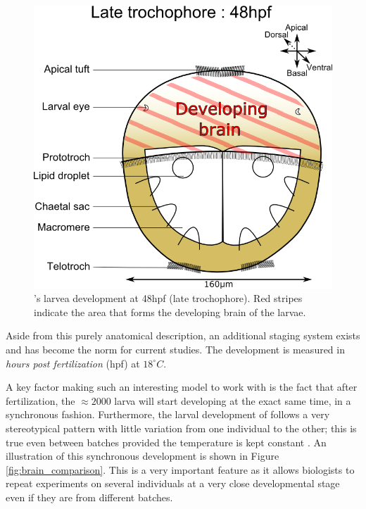 \begin{figure}[bth]
\begin{center}
  \includegraphics[width=0.6\linewidth]{gfx/chapter1/larvae48hpf.png}
\end{center}
  \caption{\platyfull{}'s larvea development at 48hpf (late trochophore). Red stripes indicate the area that forms the developing brain of the larvae.}
  \label{fig:platynereis_larvae_scheme}
\end{figure}
    
    Aside from this purely anatomical description, an additional staging system exists and has become the norm for current studies. The development is measured in \textit{hours post fertilization} (hpf) at $18^{\circ}C$.
    
    A key factor making \platy{} such an interesting model to work with is the fact that after fertilization, the $\approx 2000$ larva will start developing at the exact same time, in a synchronous fashion. Furthermore, the larval development of \platy{} follows a very stereotypical pattern with little variation from one individual to the other; this is true even between batches provided the temperature is kept constant \cite{fischer04,dorresteijn90}. An illustration of this synchronous development is shown in Figure \ref{fig:brain_comparison}. This is a very important feature as it allows biologists to repeat experiments on several individuals at a very close developmental stage even if they are from different batches.\\
    
